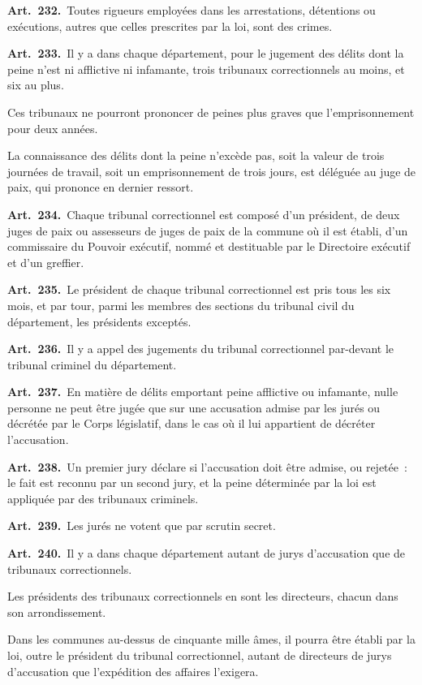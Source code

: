\documentclass[french,twoside]{book} %
\newcommand{\labelchar}[1]{\textbf{\color{rubric} #1}}
\begin{document}
\labelchar{Art. 232.} Toutes rigueurs employées dans les arrestations, détentions ou exécutions, autres que celles prescrites par la loi, sont des crimes.\par
\labelchar{Art. 233.} Il y a dans chaque département, pour le jugement des délits dont la peine n’est ni afflictive ni infamante, trois tribunaux correctionnels au moins, et six au plus.\par
Ces tribunaux ne pourront prononcer de peines plus graves que l’emprisonnement pour deux années.\par
La connaissance des délits dont la peine n’excède pas, soit la valeur de trois journées de travail, soit un emprisonnement de trois jours, est déléguée au juge de paix, qui prononce en dernier ressort.\par
\labelchar{Art. 234.} Chaque tribunal correctionnel est composé d’un président, de deux juges de paix ou assesseurs de juges de paix de la commune où il est établi, d’un commissaire du Pouvoir exécutif, nommé et destituable par le Directoire exécutif et d’un greffier.\par
\labelchar{Art. 235.} Le président de chaque tribunal correctionnel est pris tous les six mois, et par tour, parmi les membres des sections du tribunal civil du département, les présidents exceptés.\par
\labelchar{Art. 236.} Il y a appel des jugements du tribunal correctionnel par-devant le tribunal criminel du département.\par
\labelchar{Art. 237.} En matière de délits emportant peine afflictive ou infamante, nulle personne ne peut être jugée que sur une accusation admise par les jurés ou décrétée par le Corps législatif, dans le cas où il lui appartient de décréter l’accusation.\par
\labelchar{Art. 238.} Un premier jury déclare si l’accusation doit être admise, ou rejetée : le fait est reconnu par un second jury, et la peine déterminée par la loi est appliquée par des tribunaux criminels.\par
\labelchar{Art. 239.} Les jurés ne votent que par scrutin secret.\par
\labelchar{Art. 240.} Il y a dans chaque département autant de jurys d’accusation que de tribunaux correctionnels.\par
Les présidents des tribunaux correctionnels en sont les directeurs, chacun dans son arrondissement.\par
Dans les communes au-dessus de cinquante mille âmes, il pourra être établi par la loi, outre le président du tribunal correctionnel, autant de directeurs de jurys d’accusation que l’expédition des affaires l’exigera.\par
\end{document}
